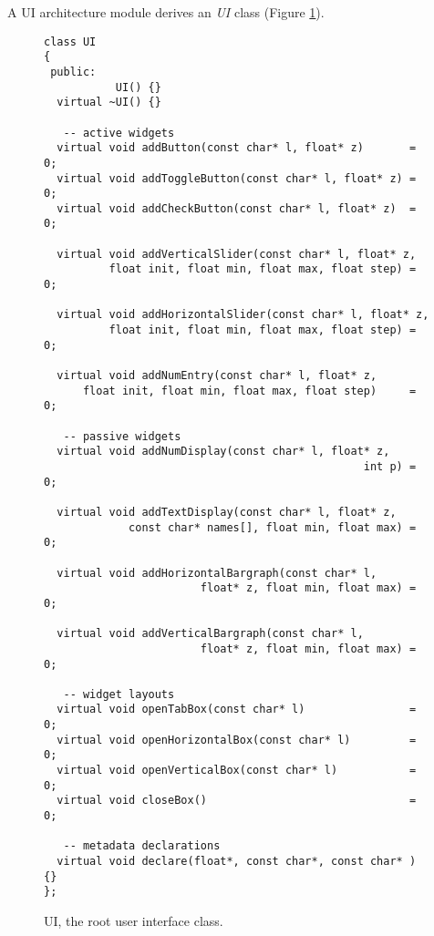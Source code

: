 A \faust UI architecture module derives an \emph{UI} class (Figure \ref{tab:ui}). 

\begin{figure}[htdp]
\begin{center}
\begin{lstlisting}[basicstyle=\ttfamily\footnotesize\color{yotxt}]
class UI
{
 public:
           UI() {}
  virtual ~UI() {}

   -- active widgets
  virtual void addButton(const char* l, float* z)       = 0;
  virtual void addToggleButton(const char* l, float* z) = 0;
  virtual void addCheckButton(const char* l, float* z)  = 0;
  
  virtual void addVerticalSlider(const char* l, float* z, 
          float init, float min, float max, float step) = 0;
          
  virtual void addHorizontalSlider(const char* l, float* z, 
          float init, float min, float max, float step) = 0;
          
  virtual void addNumEntry(const char* l, float* z, 
      float init, float min, float max, float step)     = 0;
      
   -- passive widgets
  virtual void addNumDisplay(const char* l, float* z,
                                                 int p) = 0;
                                                 
  virtual void addTextDisplay(const char* l, float* z, 
             const char* names[], float min, float max) = 0;
             
  virtual void addHorizontalBargraph(const char* l,
                        float* z, float min, float max) = 0;
                        
  virtual void addVerticalBargraph(const char* l, 
                        float* z, float min, float max) = 0; 
                        
   -- widget layouts
  virtual void openTabBox(const char* l)                = 0;
  virtual void openHorizontalBox(const char* l)         = 0;
  virtual void openVerticalBox(const char* l)           = 0;
  virtual void closeBox()                               = 0;
        
   -- metadata declarations
  virtual void declare(float*, const char*, const char* ) {}
};
\end{lstlisting} 
\end{center}
\caption{UI, the root user interface class.}
\label{tab:ui}
\end{figure}


